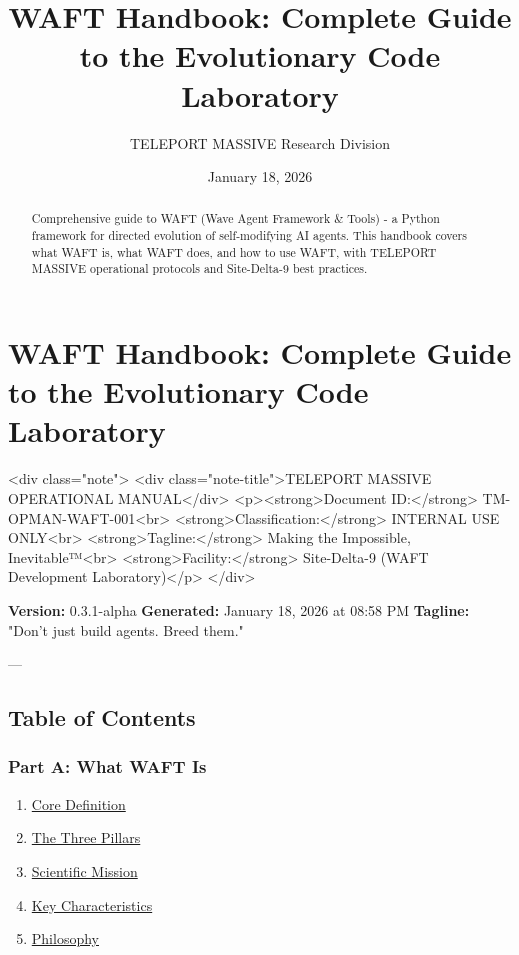 \documentclass{article}
\title{WAFT Handbook: Complete Guide to the Evolutionary Code Laboratory}
\author{TELEPORT MASSIVE Research Division}
\date{January 18, 2026}
\begin{document}
\maketitle

\begin{abstract}
Comprehensive guide to WAFT (Wave Agent Framework & Tools) - a Python framework for directed evolution of self-modifying AI agents. This handbook covers what WAFT is, what WAFT does, and how to use WAFT, with TELEPORT MASSIVE operational protocols and Site-Delta-9 best practices.
\end{abstract}


\section{WAFT Handbook: Complete Guide to the Evolutionary Code Laboratory}

<div class="note">
    <div class="note-title">TELEPORT MASSIVE OPERATIONAL MANUAL</div>
    <p><strong>Document ID:</strong> TM-OPMAN-WAFT-001<br>
    <strong>Classification:</strong> INTERNAL USE ONLY<br>
    <strong>Tagline:</strong> Making the Impossible, Inevitable™<br>
    <strong>Facility:</strong> Site-Delta-9 (WAFT Development Laboratory)</p>
</div>

\textbf{Version:} 0.3.1-alpha  
\textbf{Generated:} January 18, 2026 at 08:58 PM  
\textbf{Tagline:} "Don't just build agents. Breed them."

---

\subsection{Table of Contents}

\subsubsection{Part A: What WAFT Is}
\begin{enumerate}
\item \href{#core-definition}{Core Definition}
\item \href{#the-three-pillars}{The Three Pillars}
\item \href{#scientific-mission}{Scientific Mission}
\item \href{#key-characteristics}{Key Characteristics}
\item \href{#philosophy}{Philosophy}
\end{enumerate}
\end{document}
